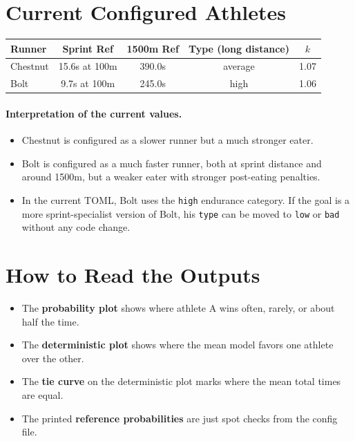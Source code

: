 \documentclass[11pt]{article}
\begin{document}
\section*{Current Configured Athletes}

\begin{center}
\begin{tabular}{|l|c|c|c|c|}
\hline
\textbf{Runner} & \textbf{Sprint Ref} & \textbf{1500m Ref} & \textbf{Type (long distance)} & \textbf{$k$} \\
\hline
Chestnut & 15.6s at 100m & 390.0s & average & 1.07 \\
\hline
Bolt & 9.7s at 100m & 245.0s & high & 1.06 \\
\hline
\end{tabular}
\end{center}

\paragraph{Interpretation of the current values.}
\begin{itemize}
    \item Chestnut is configured as a slower runner but a much stronger eater.
    \item Bolt is configured as a much faster runner, both at sprint distance and around 1500m, but a weaker eater with stronger post-eating penalties.
    \item In the current TOML, Bolt uses the \texttt{high} endurance category. If the goal is a more sprint-specialist version of Bolt, his \texttt{type} can be moved to \texttt{low} or \texttt{bad} without any code change.
\end{itemize}

\section*{How to Read the Outputs}

\begin{itemize}
    \item The \textbf{probability plot} shows where athlete A wins often, rarely, or about half the time.
    \item The \textbf{deterministic plot} shows where the mean model favors one athlete over the other.
    \item The \textbf{tie curve} on the deterministic plot marks where the mean total times are equal.
    \item The printed \textbf{reference probabilities} are just spot checks from the config file.
\end{itemize}
\end{document}
